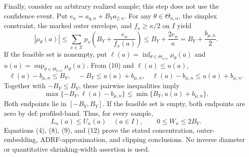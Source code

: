 Finally, consider an arbitrary realized sample; this step does not use the
confidence event.  Put \(e_n=a_{q,n}+B_Ya_{f,n}\).  For any
\(\theta\in\Theta_{n,\alpha}\), the simplex constraint, the marked outer
envelope, and \(f_x\ge\kappa/2\) on \(I\) yield
\[
 |\mu_\theta(a)|
 \le\sum_{x\in\mathcal X}p_x
 \left(B_Y+\frac{e_n}{f_x(a)}\right)
 \le B_Y+\frac{2e_n}{\kappa}
 =B_Y+\frac{b_{\mu,n}}2.                                          \tag{10}
\]
If the feasible set is nonempty, put
\(\ell(a)=\inf_{\theta\in\Theta_{n,\alpha}}\mu_\theta(a)\) and
\(u(a)=\sup_{\theta\in\Theta_{n,\alpha}}\mu_\theta(a)\).  From (10) and
\(\ell(a)\le u(a)\),
\[
 \ell(a)-b_{\mu,n}\le B_Y,
 \quad -B_Y\le u(a)+b_{\mu,n},
 \quad \ell(a)-b_{\mu,n}\le u(a)+b_{\mu,n}.                      \tag{11}
\]
Together with \(-B_Y\le B_Y\), these pairwise inequalities imply
\[
 \max\{-B_Y,\ell(a)-b_{\mu,n}\}
 \le\min\{B_Y,u(a)+b_{\mu,n}\}.
\]
Both endpoints lie in \([-B_Y,B_Y]\).  If the feasible set is empty, both
endpoints are zero by \(\mathrm{def{:}profiled\text{-}band}\).  Thus, for
every sample,
\[
 L_n(a)\le U_n(a)\quad(a\in I),
 \qquad 0\le W_n\le2B_Y.                                          \tag{12}
\]
Equations (4), (8), (9), and (12) prove the stated concentration,
outer-embedding, ADRF-approximation, and clipping conclusions.  No inverse
diameter or quantitative shrinking-width assertion is used.
